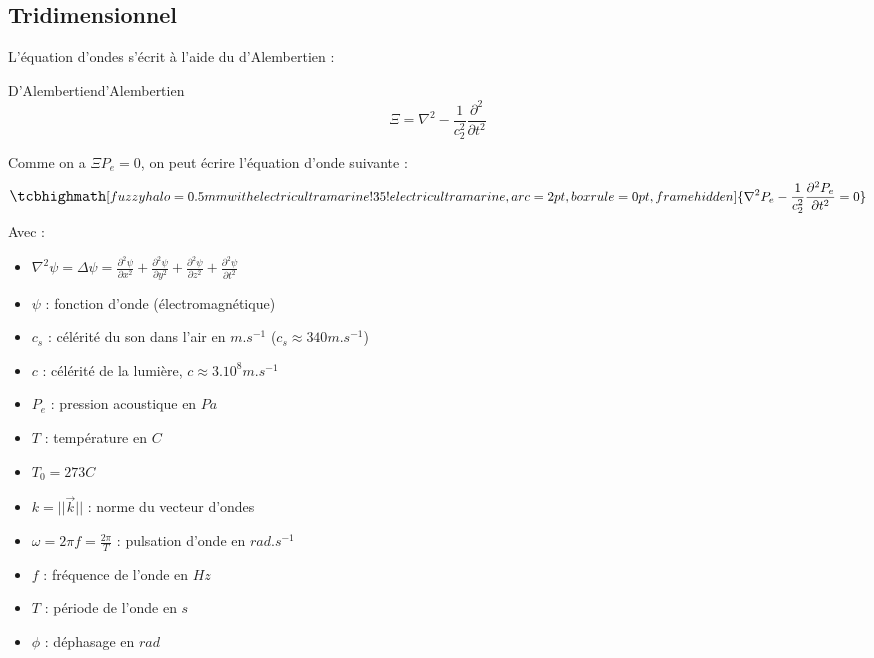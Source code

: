 \subsection{Tridimensionnel}
L'équation d'ondes s'écrit à l'aide du d'Alembertien : 
\begin{definition}{D'Alembertien}{d'Alembertien}
    \[ \Xi = \nabla^{2} - \frac{1}{c_{2}^{2}}\frac{\partial^{2}}{\partial t^{2}} \]
\end{definition}
Comme on a $\Xi P_{e} = 0$, on peut écrire l'équation d'onde suivante :
\begin{equation}
    \large
    \tcbhighmath[fuzzy halo=0.5mm with electricultramarine!35!electricultramarine,arc=2pt,
    boxrule=0pt,frame hidden]{ 
        \nabla^{2}P_{e} - \frac{1}{c_{2}^{2}}\frac{\partial^{2} P_{e}}{\partial t^{2}} = 0 \nonumber
     } \nonumber
    \normalsize
\end{equation}
Avec : \newline
\large
\begin{itemize}
    \item $\nabla^{2}\psi = \Delta \psi = \frac{\partial^{2} \psi}{\partial x^{2}} + \frac{\partial^{2} \psi}{\partial y^{2}} + \frac{\partial^{2} \psi}{\partial z^{2}} + \frac{\partial^{2} \psi}{\partial t^{2}}$ \newline
    \item $\psi$ : fonction d'onde (électromagnétique) \newline
    \item $c_{s}$ : célérité du son dans l'air en $m.s^{-1}$ ($c_{s} \approx 340 m.s^{-1}$) \newline
    \item $c$ : célérité de la lumière, $c\approx 3.10^{8}m.s^{-1}$ \newline
    \item $P_{e}$ : pression acoustique en $Pa$ \newline
    \item $T$ : température en $C$ \newline
    \item $T_{0} = 273 C$ \newline
    \item $k = ||\vec{k}||$ : norme du vecteur d'ondes \newline
    \item $\omega = 2\pi f = \frac{2\pi}{T}$ : pulsation d'onde en $rad.s^{-1}$ \newline
    \item $f$ : fréquence de l'onde en $Hz$ \newline
    \item $T$ : période de l'onde en $s$ \newline
    \item $\phi$ : déphasage en $rad$
\end{itemize}
\normalsize
\newpage
